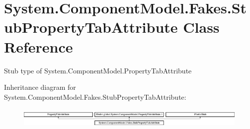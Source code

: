 \hypertarget{class_system_1_1_component_model_1_1_fakes_1_1_stub_property_tab_attribute}{\section{System.\-Component\-Model.\-Fakes.\-Stub\-Property\-Tab\-Attribute Class Reference}
\label{class_system_1_1_component_model_1_1_fakes_1_1_stub_property_tab_attribute}
}


Stub type of System.\-Component\-Model.\-Property\-Tab\-Attribute 


Inheritance diagram for System.\-Component\-Model.\-Fakes.\-Stub\-Property\-Tab\-Attribute\-:\begin{figure}[H]
\begin{center}
\leavevmode
\includegraphics[height=1.000894cm]{class_system_1_1_component_model_1_1_fakes_1_1_stub_property_tab_attribute}
\end{center}
\end{figure}
